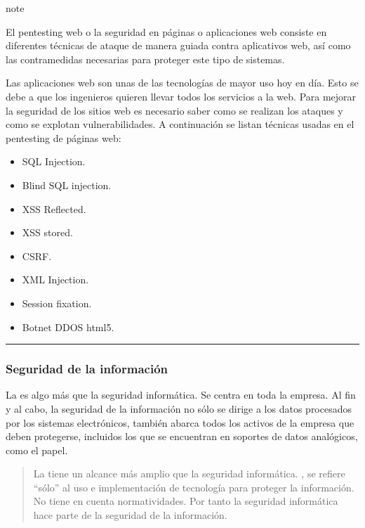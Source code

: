 \documentclass[letterpaper,10pt,spanish]{sphinxmanual}
\begin{document}
\begin{sphinxadmonition}{note}{}

\sphinxAtStartPar
El pentesting web o la seguridad en páginas o aplicaciones web consiste en diferentes técnicas de ataque de manera guiada contra aplicativos web, así como las contramedidas necesarias para proteger este tipo de sistemas.

\sphinxAtStartPar
Las aplicaciones web son unas de las tecnologías de mayor uso hoy en día. Esto se debe a que los ingenieros quieren llevar todos los servicios a la web. Para mejorar la seguridad de los sitios web es necesario saber como se realizan los ataques y como se explotan vulnerabilidades. A continuación se listan técnicas usadas en el pentesting de páginas web:
\begin{itemize}
\item {} 
\sphinxAtStartPar
SQL Injection.

\item {} 
\sphinxAtStartPar
Blind SQL injection.

\item {} 
\sphinxAtStartPar
XSS Reflected.

\item {} 
\sphinxAtStartPar
XSS stored.

\item {} 
\sphinxAtStartPar
CSRF.

\item {} 
\sphinxAtStartPar
XML Injection.

\item {} 
\sphinxAtStartPar
Session fixation.

\item {} 
\sphinxAtStartPar
Botnet DDOS html5.

\end{itemize}
\end{sphinxadmonition}


\bigskip\hrule\bigskip



\subsubsection{Seguridad de la información}
\label{\detokenize{1_guias/10informatica/G1003:seguridad-de-la-informacion}}
\sphinxAtStartPar
La  es algo más que la seguridad informática. Se centra en toda la empresa. Al fin y al cabo, la seguridad de la información no sólo se dirige a los datos procesados por los sistemas electrónicos, también abarca todos los activos de la empresa que deben protegerse, incluidos los que se encuentran en soportes de datos analógicos, como el papel.
\begin{quote}

\sphinxAtStartPar
La  tiene un alcance más amplio que la seguridad informática. , se refiere “sólo” al uso e implementación de tecnología para proteger la información. No tiene en cuenta normatividades. Por tanto la seguridad informática hace parte de la seguridad de la información.
\end{quote}
\end{document}
